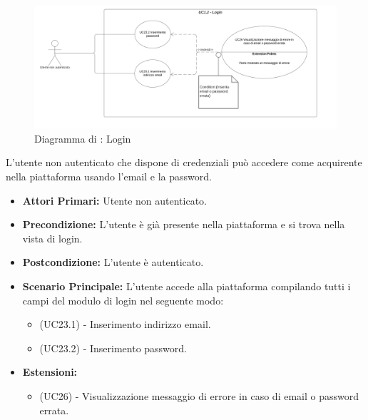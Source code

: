 
\begin{figure}[H]
    \centering
    \includegraphics[scale=0.6]{Immagini/DiagrammiUC/UC1.2Login.png}
    \caption{Diagramma di \actualUC: Login} 
    \label{fig:Login}
\end{figure}

L'utente non autenticato che dispone di credenziali può accedere come acquirente nella piattaforma usando l'email e la password.
\begin{itemize}
    \item \textbf{Attori Primari:} Utente non autenticato.
    \item \textbf{Precondizione:} L'utente è già presente nella piattaforma e si trova nella vista di login.
    \item \textbf{Postcondizione:} L'utente è autenticato.
    \item \textbf{Scenario Principale:} L'utente accede alla piattaforma compilando tutti i campi del modulo di login nel seguente modo:
    \begin{itemize}
        \item (UC23.1) - Inserimento indirizzo email.
        \item (UC23.2) - Inserimento password.
    \end{itemize}
    \item \textbf{Estensioni:}
    \begin{itemize}
        \item (UC26) - Visualizzazione messaggio di errore in caso di email o password errata.
    \end{itemize}
\end{itemize}


